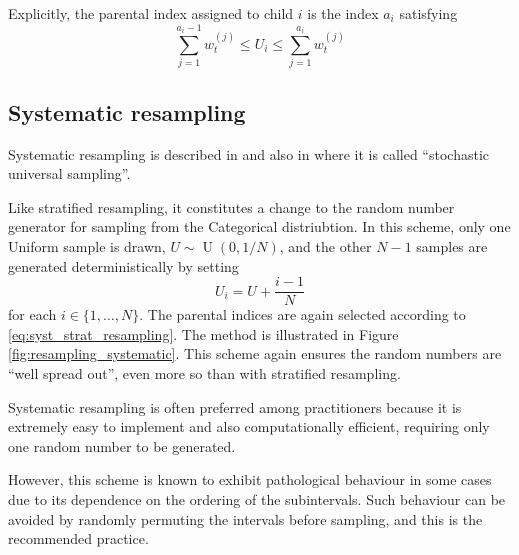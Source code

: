 \documentclass[fleqn]{article}
\theoremstyle{definition}
\newcommand{\wt}[2][t]{w_{#1}^{(#2)}}
\begin{document}
Explicitly, the parental index assigned to child $i$ is the index $a_i$ satisfying
\begin{equation}\label{eq:syst_strat_resampling}
\sum_{j=1}^{a_i -1} \wt{j} \leq U_i \leq \sum_{j=1}^{a_i} \wt{j}
\end{equation}

\subsection{Systematic resampling}
Systematic resampling is described in \citet{carpenter1999} and also in \citet{whitley1994} where it is called ``stochastic universal sampling''.

Like stratified resampling, it constitutes a change to the random number generator for sampling from the Categorical distriubtion. 
In this scheme, only one Uniform sample is drawn, $U \sim \operatorname{U}(0,1/N)$, and the other $N-1$ samples are generated deterministically by setting
\begin{equation*}
U_i = U + \frac{i-1}{N}
\end{equation*}
for each $i \in \{1, \dots, N\}$.
The parental indices are again selected according to \eqref{eq:syst_strat_resampling}. 
The method is illustrated in Figure \ref{fig:resampling_systematic}.
This scheme again ensures the random numbers are ``well spread out'', even more so than with stratified resampling.

Systematic resampling is often preferred among practitioners because it is extremely easy to implement and also computationally efficient, requiring only one random number to be generated.

However, this scheme is known to exhibit pathological behaviour in some cases due to its dependence on the ordering of the subintervals. Such behaviour can be avoided by randomly permuting the intervals before sampling, and this is the recommended practice. 
\end{document}
